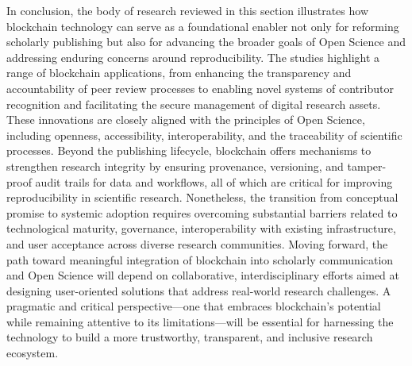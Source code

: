 \documentclass{article}
\begin{document}
In conclusion, the body of research reviewed in this section illustrates how blockchain technology can serve as a foundational enabler not only for reforming scholarly publishing but also for advancing the broader goals of Open Science and addressing enduring concerns around reproducibility. The studies highlight a range of blockchain applications, from enhancing the transparency and accountability of peer review processes to enabling novel systems of contributor recognition and facilitating the secure management of digital research assets. These innovations are closely aligned with the principles of Open Science, including openness, accessibility, interoperability, and the traceability of scientific processes. Beyond the publishing lifecycle, blockchain offers mechanisms to strengthen research integrity by ensuring provenance, versioning, and tamper-proof audit trails for data and workflows, all of which are critical for improving reproducibility in scientific research. Nonetheless, the transition from conceptual promise to systemic adoption requires overcoming substantial barriers related to technological maturity, governance, interoperability with existing infrastructure, and user acceptance across diverse research communities. Moving forward, the path toward meaningful integration of blockchain into scholarly communication and Open Science will depend on collaborative, interdisciplinary efforts aimed at designing user-oriented solutions that address real-world research challenges. A pragmatic and critical perspective—one that embraces blockchain's potential while remaining attentive to its limitations—will be essential for harnessing the technology to build a more trustworthy, transparent, and inclusive research ecosystem.




\end{document}
